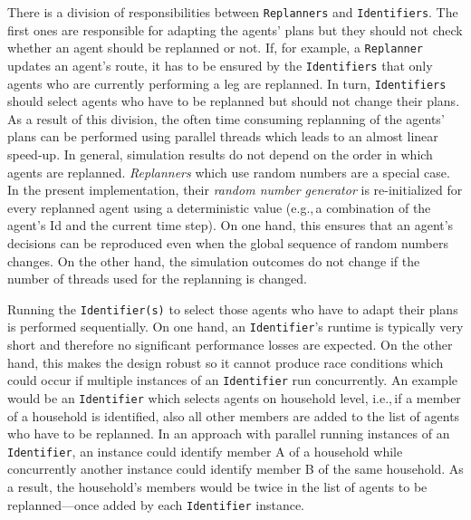 
There is a division of responsibilities between \lstinline{Replanners} and \lstinline{Identifiers}. The first ones are responsible for adapting the agents' plans but they should not check whether an agent should be replanned or not. If, for example, a \lstinline{Replanner} updates an agent's route, it has to be ensured by the \lstinline{Identifiers} that only agents who are currently performing a leg are replanned. In turn, \lstinline{Identifiers} should select agents who have to be replanned but should not change their plans. As a result of this division, the often time consuming replanning of the agents' plans can be performed using parallel threads which leads to an almost linear speed-up. In general, simulation results do not depend on the order in which agents are replanned. \emph{Replanners} which use random numbers are a special case. 
In the present implementation, their \emph{random number generator} is re-initialized for every replanned agent using a deterministic value (e.g.,\,a combination of the agent's Id and the current time step). On one hand, this ensures that an agent's decisions can be reproduced even when the global sequence of random numbers changes. On the other hand, the simulation outcomes do not change if the number of threads used for the replanning is changed.


Running the \lstinline{Identifier(s)} to select those agents who have to adapt their plans is performed sequentially. On one hand, an \lstinline{Identifier}'s runtime is typically very short and therefore no significant performance losses are expected. On the other hand, 
this makes the design robust so it cannot produce race conditions which could occur if multiple instances of an \lstinline{Identifier} run concurrently. An example would be an \lstinline{Identifier} which selects agents on household level, i.e.,\,if a member of a household is identified, also all other members are added to the list of agents who have to be replanned. In an approach with parallel running instances of an \lstinline{Identifier}, an instance could identify member A of a household while concurrently another instance could identify member B of the same household. As a result, the household's members would be twice in the list of agents to be replanned---once added by each \lstinline{Identifier} instance.

